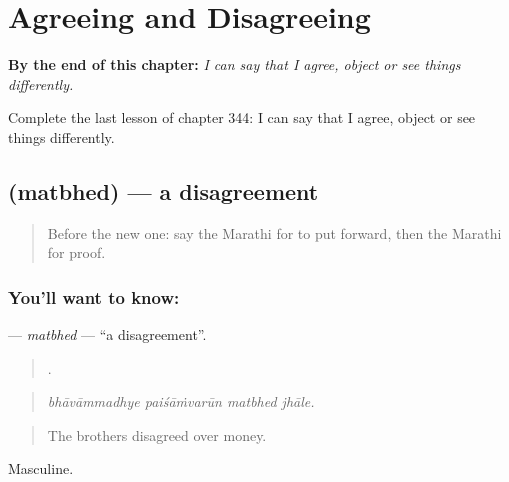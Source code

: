 
\chapter{Agreeing and Disagreeing}
\label{ch:mr-agreeing-and-disagreeing}

\begin{chapteropening}
\textbf{By the end of this chapter:} \emph{I can say that I agree, object or see things differently.}

Complete the last lesson of chapter 344: I can say that I agree, object or see things differently.
\end{chapteropening}

\section[\texorpdfstring{\mr{मतभेद} (matbhed)}{मतभेद (matbhed)}]{ (matbhed) — a disagreement}

\label{lesson:MR-C344-matbhed}



\begin{quote}
Before the new one: say the Marathi for to put forward, then the Marathi for proof.
\end{quote}

\subsection*{You'll want to know: }
\textbf{} — \emph{matbhed} — \textquotedblleft{}a disagreement\textquotedblright{}.

\begin{quote}
   .
\end{quote}

\begin{quote}
\emph{bhāvāmmadhye paiśāṁvarūn matbhed jhāle.}
\end{quote}

\begin{quote}
The brothers disagreed over money.
\end{quote}

Masculine.

